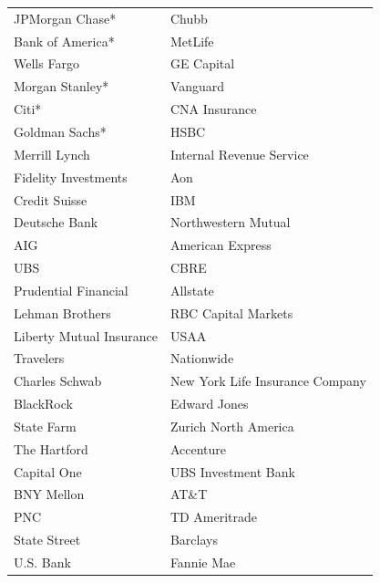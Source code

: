 
\begin{tabular}{p{7cm}p{7cm}}
\toprule
 & \\
\midrule
JPMorgan Chase* & Chubb \\
Bank of America* & MetLife \\
Wells Fargo & GE Capital \\
Morgan Stanley* & Vanguard \\
Citi* & CNA Insurance \\
Goldman Sachs* & HSBC \\
Merrill Lynch & Internal Revenue Service \\
Fidelity Investments & Aon \\
Credit Suisse & IBM \\
Deutsche Bank & Northwestern Mutual \\
AIG & American Express \\
UBS & CBRE \\
Prudential Financial & Allstate \\
Lehman Brothers & RBC Capital Markets \\
Liberty Mutual Insurance & USAA \\
Travelers & Nationwide \\
Charles Schwab & New York Life Insurance Company \\
BlackRock & Edward Jones \\
State Farm & Zurich North America \\
The Hartford & Accenture \\
Capital One & UBS Investment Bank \\
BNY Mellon & AT\&T \\
PNC & TD Ameritrade \\
State Street & Barclays \\
U.S. Bank & Fannie Mae \\

\bottomrule
\end{tabular}
